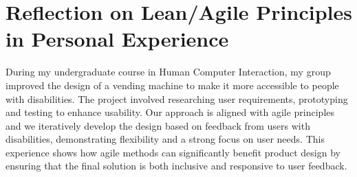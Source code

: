 \documentclass[UTF8,a4paper,AutoFakeBold,AutoFakeSlant]{article}
\begin{document}
\section{Reflection on Lean/Agile Principles in Personal Experience}

During my undergraduate course in Human Computer Interaction, my group improved the design of a vending machine to make it more accessible to people with disabilities. The project involved researching user requirements, prototyping and testing to enhance usability. Our approach is aligned with agile principles and we iteratively develop the design based on feedback from users with disabilities, demonstrating flexibility and a strong focus on user needs. This experience shows how agile methods can significantly benefit product design by ensuring that the final solution is both inclusive and responsive to user feedback.


% 
% 
% 
\end{document}
